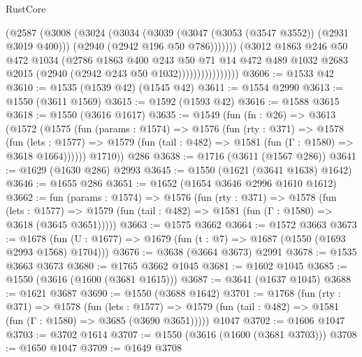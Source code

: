 \begin{lexlean}{RustCore}
\begin{coremodule}
                              (@2587
                                (@3008
                                  (@3024
                                    (@3034
                                      (@3039 (@3047 (@3053 (@3547 @3552)) (@2931 @3019 @400)))
                                      (@2940 (@2942 @196 @50 @786)))))))
                            (@3012
                              @1863
                              @246
                              @50
                              @472
                              @1034
                              (@2786
                                @1863
                                @400
                                @243
                                @50
                                @71
                                @14
                                @472
                                @489
                                @1032
                                @2683
                                @2015
                                (@2940 (@2942 @243 @50 @1032))))))))))))))))
@3606 := @1533 @42
@3610 := @1535 (@1539 @42) (@1545 @42)
@3611 := @1554 @2990
@3613 := @1550 (@3611 @1569)
@3615 := @1592 (@1593 @42)
@3616 := @1588 @3615
@3618 := @1550 (@3616 @1617)
@3635 := @1549
    (fun (fn : @26) =>
    @3613
      (@1572
        (@1575
          (fun (params : @1574) =>
          @1576
            (fun (rty : @371) =>
            @1578
              (fun (lets : @1577) =>
              @1579 (fun (tail : @482) => @1581 (fun (Γ : @1580) => @3618 @1664))))))
        @1710))
    @286
@3638 := @1716 (@3611 (@1567 @286))
@3641 := @1629 (@1630 @286) @2993
@3645 := @1550 (@1621 (@3641 @1638) @1642)
@3646 := @1655 @286
@3651 := @1652 (@1654 @3646 @2996 @1610 @1612)
@3662 := fun (params : @1574) =>
  @1576
    (fun (rty : @371) =>
    @1578
      (fun (lets : @1577) =>
      @1579 (fun (tail : @482) => @1581 (fun (Γ : @1580) => @3618 (@3645 @3651)))))
@3663 := @1575 @3662
@3664 := @1572 @3663
@3673 := @1678 (fun (U : @1677) => @1679 (fun (t : @7) => @1687 (@1550 (@1693 @2993 @1568) @1704)))
@3676 := @3638 (@3664 @3673) @2991
@3678 := @1535 @3663 @3673
@3680 := @1765 @3662 @1045
@3681 := @1602 @1045
@3685 := @1550 (@3616 (@1600 (@3681 @1615)))
@3687 := @3641 (@1637 @1045)
@3688 := @1621 @3687
@3690 := @1550 (@3688 @1642)
@3701 := @1768
    (fun (rty : @371) =>
    @1578
      (fun (lets : @1577) =>
      @1579 (fun (tail : @482) => @1581 (fun (Γ : @1580) => @3685 (@3690 @3651)))))
    @1047
@3702 := @1606 @1047
@3703 := @3702 @1614
@3707 := @1550 (@3616 (@1600 (@3681 @3703)))
@3708 := @1650 @1047
@3709 := @1649 @3708

\end{coremodule}
\end{lexlean}
